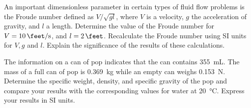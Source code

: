 \begin{question}
  An important dimensionless parameter in certain types of fluid flow
  problems is the Froude number defined as $V/\sqrt{gl}$, where $V$ is
  a velocity, $g$ the acceleration of gravity, and $l$ a
  length. Determine the value of the Froude number for $V =
  \SI{10}{\feet/\s}$, and $l=\SI{2}{\feet}$. Recalculate the Froude
  number using SI units for $V, g$ and $l$. Explain the significance
  of the results of these calculations.
\end{question}

\begin{question}
  The information on a can of pop indicates that the can contains
  \SI{355}{\mL}. The mass of a full can of pop is \SI{0.369}{\kg}
  while an empty can weighs \SI{0.153}{\N}. Determine the specific
  weight, density, and specific gravity of the pop and compare your
  results with the corresponding values for water at
  \SI{20}{\celsius}. Express your results in SI units.
\end{question}
